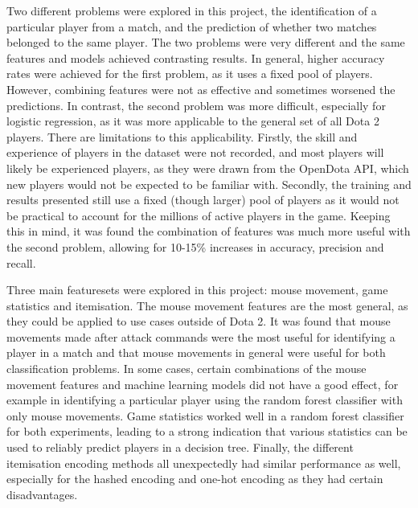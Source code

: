 \documentclass[Report.tex]{subfiles}
\begin{document}
Two different problems were explored in this project, the identification of a particular player from a match, and the prediction of whether two matches belonged to the same player. The two problems were very different and the same features and models achieved contrasting results. In general, higher accuracy rates were achieved for the first problem, as it uses a fixed pool of players. However, combining features were not as effective and sometimes worsened the predictions. In contrast, the second problem was more difficult, especially for logistic regression, as it was more applicable to the general set of all Dota 2 players. There are limitations to this applicability. Firstly, the skill and experience of players in the dataset were not recorded, and most players will likely be experienced players, as they were drawn from the OpenDota API, which new players would not be expected to be familiar with. Secondly, the training and results presented still use a fixed (though larger) pool of players as it would not be practical to account for the millions of active players in the game. Keeping this in mind, it was found the combination of features was much more useful with the second problem, allowing for 10-15\% increases in accuracy, precision and recall. 

Three main featuresets were explored in this project: mouse movement, game statistics and itemisation. The mouse movement features are the most general, as they could be applied to use cases outside of Dota 2. It was found that mouse movements made after attack commands were the most useful for identifying a player in a match and that mouse movements in general were useful for both classification problems. In some cases, certain combinations of the mouse movement features and machine learning models did not have a good effect, for example in identifying a particular player using the random forest classifier with only mouse movements. Game statistics worked well in a random forest classifier for both experiments, leading to a strong indication that various statistics can be used to reliably predict players in a decision tree. Finally, the different itemisation encoding methods all unexpectedly had similar performance as well, especially for the hashed encoding and one-hot encoding as they had certain disadvantages.
\end{document}
